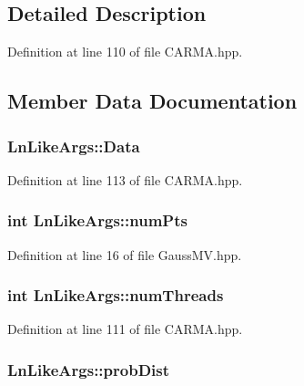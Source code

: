 \subsection{Detailed Description}


Definition at line 110 of file C\-A\-R\-M\-A.\-hpp.



\subsection{Member Data Documentation}
\hypertarget{struct_ln_like_args_aa9a0a2c4945292f8429e4f0738db611b}{
\subsubsection[{Data}]{ Ln\-Like\-Args\-::\-Data}}\label{struct_ln_like_args_aa9a0a2c4945292f8429e4f0738db611b}


Definition at line 113 of file C\-A\-R\-M\-A.\-hpp.

\hypertarget{struct_ln_like_args_a14cedd7e2fed9d152ce3de6383567dad}{
\subsubsection[{num\-Pts}]{\setlength{\rightskip}{0pt plus 5cm}int Ln\-Like\-Args\-::num\-Pts}}\label{struct_ln_like_args_a14cedd7e2fed9d152ce3de6383567dad}


Definition at line 16 of file Gauss\-M\-V.\-hpp.

\hypertarget{struct_ln_like_args_ad84da20749d9935f6a5a04b5c56d729a}{
\subsubsection[{num\-Threads}]{\setlength{\rightskip}{0pt plus 5cm}int Ln\-Like\-Args\-::num\-Threads}}\label{struct_ln_like_args_ad84da20749d9935f6a5a04b5c56d729a}


Definition at line 111 of file C\-A\-R\-M\-A.\-hpp.

\hypertarget{struct_ln_like_args_ad8d1ee1e21bab664c116720df98cf287}{
\subsubsection[{prob\-Dist}]{ Ln\-Like\-Args\-::prob\-Dist}}\label{struct_ln_like_args_ad8d1ee1e21bab664c116720df98cf287}


